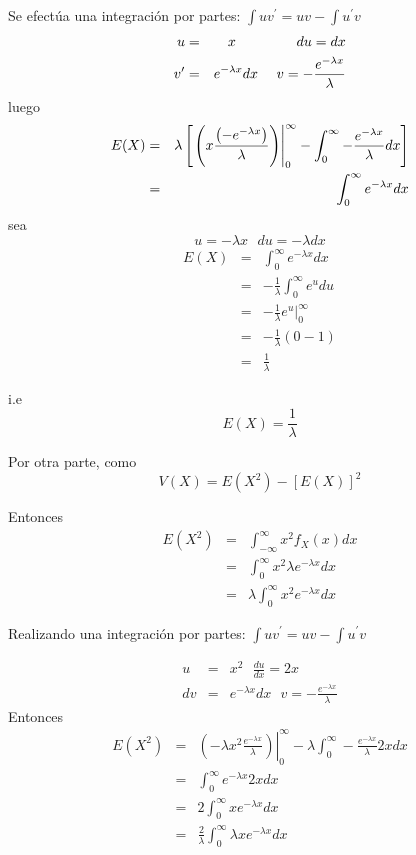 \begin{i}
Se efectúa una integración por partes: $\int uv^{\prime }=uv-\int u^{\prime }v$
\begin{eqnarray*}
u &=&x\text{ \ \ \ \ \ \ \ \ \ \ \ \ }du=dx \\
v^{\prime } &=&e^{-\lambda x}dx\text{ \ \ \ }v=-\frac{e^{-\lambda x}}{%
\lambda }
\end{eqnarray*}%
luego
\begin{eqnarray*}
E(X) &=&\lambda \left[ \left. \left( x\frac{\left( -e^{-\lambda x}\right) }{%
\lambda }\right) \right\vert _{0}^{\infty }-\int_{0}^{\infty }-\frac{%
e^{-\lambda x}}{\lambda }dx\right] \\
&=&\int_{0}^{\infty }e^{-\lambda x}dx
\end{eqnarray*}
sea 
\begin{equation*}
u=-\lambda x\text{ \ }du=-\lambda dx
\end{equation*}
\begin{eqnarray*}
E(X) &=&\int_{0}^{\infty }e^{-\lambda x}dx \\
&=&-\frac{1}{\lambda }\int_{0}^{\infty }e^{u}du \\
&=&-\frac{1}{\lambda }\left. e^{u}\right\vert _{0}^{\infty } \\
&=&-\frac{1}{\lambda }\left( 0-1\right) \\
&=&\frac{1}{\lambda }
\end{eqnarray*}

i.e
\begin{equation*}
E(X)=\frac{1}{\lambda }
\end{equation*}

Por otra parte, como 
\begin{equation*}
V(X)=E(X^{2})-\left[ E(X)\right] ^{2}
\end{equation*}

Entonces
\begin{eqnarray*}
E(X^{2}) &=&\int_{-\infty }^{\infty }x^{2}f_{X}(x)dx \\
&=&\int_{0}^{\infty }x^{2}\lambda e^{-\lambda x}dx \\
&=&\lambda \int_{0}^{\infty }x^{2}e^{-\lambda x}dx
\end{eqnarray*}

Realizando una integración por partes: $\int uv^{\prime }=uv-\int u^{\prime }v$

\begin{eqnarray*}
u &=&x^{2}\text{ \ \ \ \ \ \ \ \ \ \ \ \ }\frac{du}{dx}=2x \\
dv &=&e^{-\lambda x}dx\text{ \ \ \ \ \ \ \ \ }v=-\frac{e^{-\lambda x}}{\lambda}
\end{eqnarray*}
Entonces
\begin{eqnarray*}
E(X^{2}) &=&\left. \left( -\lambda x^{2}\frac{e^{-\lambda x}}{\lambda }
\right) \right\vert _{0}^{\infty }-\lambda \int_{0}^{\infty }-\frac{
e^{-\lambda x}}{\lambda }2xdx \\
&=&\int_{0}^{\infty }e^{-\lambda x}2xdx \\
&=&2\int_{0}^{\infty }xe^{-\lambda x}dx \\
&=&\frac{2}{\lambda }\int_{0}^{\infty }\lambda xe^{-\lambda x}dx
\end{eqnarray*}


\end{i}
